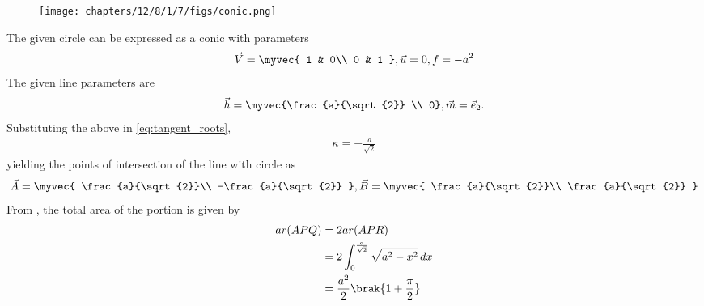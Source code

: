 	\begin{figure}[H]
		\centering
 \texttt{[image: chapters/12/8/1/7/figs/conic.png]}
		\caption{}
		\label{fig:12/8/1/7}
  	\end{figure}
The given circle can be expressed as a conic with parameters
\begin{align}
\vec{V}=
\myvec{
1 & 0\\
0 & 1
},
\vec{u}=0,
f=-a^2
\end{align} 
The given line 
parameters are
\begin{align} 
	\vec{h}=\myvec{\frac{a}{\sqrt{2}} \\ 0},  \vec{m}=\vec{e}_2.
\end{align}
Substituting the above in
\eqref{eq:tangent_roots},
\begin{align}
    \kappa =\pm\frac{a}{\sqrt{2}}
\end{align}
yielding the
points of intersection of the line with circle as
\begin{align}
    \vec{A}=\myvec{
\frac{a}{\sqrt{2}}\\
-\frac{a}{\sqrt{2}}
    },
    \vec{B}=\myvec{
\frac{a}{\sqrt{2}}\\
\frac{a}{\sqrt{2}}
    }
\end{align}
 From 
		,
the total area of the portion is given by
\begin{align}
	ar( APQ)&=2 ar (APR)
	\\
&=2\int_{0}^{\frac{a}{\sqrt{2}}}\sqrt{a^2-x^2}\,dx 
	\\
	&=\frac{a^2}{2}\brak{1+\frac{\pi}{2}}
\end{align}
